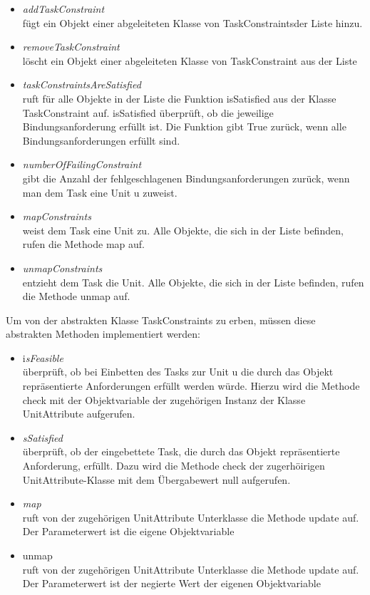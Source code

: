 \begin{itemize}
\item \textit{addTaskConstraint}\\
fügt ein Objekt einer abgeleiteten Klasse von TaskConstraintsder Liste hinzu. 
\item \textit{removeTaskConstraint}\\
löscht ein Objekt einer abgeleiteten Klasse von TaskConstraint aus der Liste
\item \textit{taskConstraintsAreSatisfied}\\
ruft für alle Objekte in der Liste die Funktion isSatisfied aus der Klasse TaskConstraint auf. isSatisfied überprüft, ob die jeweilige Bindungsanforderung erfüllt ist. Die Funktion gibt True zurück, wenn alle Bindungsanforderungen erfüllt sind.%
\item \textit{numberOfFailingConstraint}\\
gibt die Anzahl der fehlgeschlagenen Bindungsanforderungen zurück, wenn man dem Task eine Unit u zuweist. 
\item \textit{mapConstraints}\\
weist dem Task eine Unit zu. Alle Objekte, die sich in der Liste befinden, rufen die Methode map auf.
\item \textit{unmapConstraints}\\
entzieht dem Task die Unit. Alle Objekte, die sich in der Liste befinden, rufen die Methode unmap auf.
\end{itemize}

Um von der abstrakten Klasse TaskConstraints zu erben, müssen diese abstrakten Methoden implementiert werden:\\
\begin{itemize}
\item i\textit{sFeasible}\\
überprüft, ob bei Einbetten des Tasks zur Unit u die durch das Objekt repräsentierte Anforderungen erfüllt werden würde. Hierzu wird die Methode check mit der Objektvariable der zugehörigen Instanz der Klasse UnitAttribute aufgerufen. 
\item \textit{sSatisfied}\\
überprüft, ob der eingebettete Task, die durch das Objekt repräsentierte Anforderung, erfüllt. Dazu wird die Methode check der zugerhöirigen UnitAttribute-Klasse mit dem Übergabewert null aufgerufen. 
\item \textit{map} \\
ruft von der zugehörigen UnitAttribute Unterklasse die Methode update auf. Der Parameterwert ist die eigene Objektvariable
\item \textit{}unmap\\
ruft von der zugehörigen UnitAttribute Unterklasse die Methode update auf. Der Parameterwert ist der negierte Wert der eigenen Objektvariable
\end{itemize}

